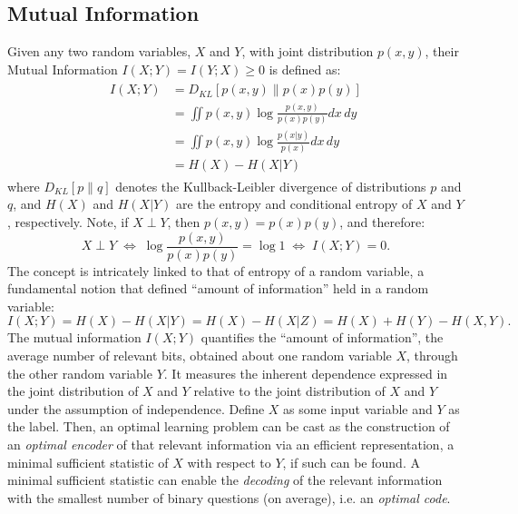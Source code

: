 \documentclass[11pt]{article}
\begin{document}
\subsection*{Mutual Information}


Given any two random variables, $X$ and $Y$, with joint distribution $p(x, y)$, their Mutual Information $I(X;Y) = I(Y;X) \geq 0$ is defined as:
\begin{align}
\begin{split}
I(X;Y)
&= D_{KL}[p(x,y)\rVert p(x)p(y)] \\[4pt]
&= \iint p(x,y) \log \frac{p(x,y)}{p(x)p(y)} dx\,dy \\
&= \iint p(x,y) \log \frac{p(x\vert y)}{p(x)} dx\,dy \\[4pt]
&= H(X) - H(X\vert Y) 
\end{split}
\end{align}
where $D_{KL}[p\rVert q]$ denotes the Kullback-Leibler divergence of distributions $p$ and $q$, and $H(X)$ and $H(X\vert Y)$ are the entropy and conditional entropy of $X$ and $Y$, respectively. Note, if $X \perp Y$, then $p(x,y) = p(x)p(y)$, and therefore:
\begin{equation}
X \perp Y \; \Leftrightarrow \; \log\frac{p(x,y)}{p(x)p(y)} = \log 1 \; \Leftrightarrow \; I(X;Y) = 0.
\end{equation}
The concept is intricately linked to that of entropy of a random variable, a fundamental notion that defined ``amount of information'' held in a random variable:
\begin{equation}
I(X;Y) = H(X) - H(X \vert Y) = H(X) - H(X \vert Z) = H(X) + H(Y) - H(X,Y).
\end{equation}
The mutual information $I(X;Y)$ quantifies the ``amount of information'', the average number of relevant bits, obtained about one random variable $X$, through the other random variable $Y$. It measures the inherent dependence expressed in the joint distribution of $X$ and $Y$ relative to the joint distribution of $X$ and $Y$ under the assumption of independence. Define $X$ as some input variable and $Y$ as the label. Then, an optimal learning problem can be cast as the construction of an \textit{optimal encoder} of that relevant information via an efficient representation, a minimal sufficient statistic of $X$ with respect to $Y$, if such can be found. A minimal sufficient statistic can enable the \textit{decoding} of the relevant information with the smallest number of binary questions (on average), i.e. an \textit{optimal code}.
\end{document}
